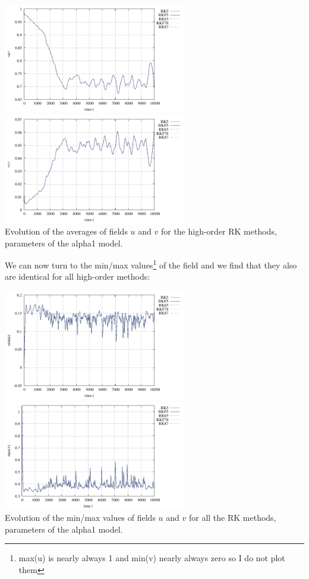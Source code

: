 \begin{center}
\includegraphics[width=8cm]{python_codes/fieldstone_171/RKtest2/avrg_u_high.pdf}
\includegraphics[width=8cm]{python_codes/fieldstone_171/RKtest2/avrg_v_high.pdf}\\
{\captionfont Evolution of the averages of fields $u$
and $v$ for the high-order RK methods, parameters of the alpha1 model.}
\end{center}


We can now turn to the min/max values\footnote{max(u) is 
nearly always 1 and min(v) nearly always zero so I do not plot them} 
of the field and we find that 
they also are identical for all high-order methods:
\begin{center}
\includegraphics[width=8cm]{python_codes/fieldstone_171/RKtest2/stats_u.pdf}
\includegraphics[width=8cm]{python_codes/fieldstone_171/RKtest2/stats_v.pdf}\\
{\captionfont Evolution of the min/max values of fields $u$
and $v$ for all the RK methods, parameters of the alpha1 model.}
\end{center}

